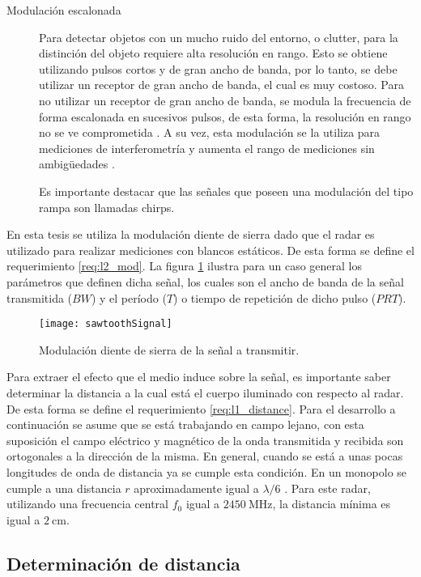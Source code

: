\begin{description}
\item[Modulación escalonada] Para detectar objetos con un mucho ruido del entorno, o clutter, para la distinción del objeto requiere alta resolución en rango. Esto se obtiene utilizando pulsos cortos y de gran ancho de banda, por lo tanto, se debe utilizar un receptor de gran ancho de banda, el cual es muy costoso. Para no utilizar un receptor de gran ancho de banda, se modula la frecuencia de forma escalonada en sucesivos pulsos, de esta forma, la resolución en rango no se ve comprometida \cite{steppedFreq}. A su vez, esta modulación se la utiliza para mediciones de interferometría y aumenta el rango de mediciones sin ambigüedades \cite{Basics2015}.

Es importante destacar que las señales que poseen una modulación del tipo rampa son llamadas chirps.

\end{description}

En esta tesis se utiliza la modulación diente de sierra dado que el radar es utilizado para realizar mediciones con blancos estáticos. De esta forma se define el requerimiento \ref{req:l2_mod}. La figura \ref{fig:sawtoothSignal} ilustra para un caso general los parámetros que definen dicha señal, los cuales son el ancho de banda de la señal transmitida ($BW$) y el período ($T$) o tiempo de repetición de dicho pulso ($PRT$).

\begin{figure}
 \centering
 \texttt{[image: sawtoothSignal]}
 \caption{Modulación diente de sierra de la señal a transmitir.}
 \label{fig:sawtoothSignal}
\end{figure}

Para extraer el efecto que el medio induce sobre la señal, es importante saber determinar la distancia a la cual está el cuerpo iluminado con respecto al radar. De esta forma se define el requerimiento \ref{req:l1_distance}. Para el desarrollo a continuación se asume que se está trabajando en campo lejano, con esta suposición el campo eléctrico y magnético de la onda transmitida y recibida son ortogonales a la dirección de la misma. En general, cuando se está a unas pocas longitudes de onda de distancia ya se cumple esta condición. En un monopolo se cumple a una distancia $r$ aproximadamente igual a $\lambda/ 6$ \cite{Richards2009}. Para este radar, utilizando una frecuencia central $f_0$ igual a $\SI{2450}{\MHz}$, la distancia mínima es igual a $\SI{2}{\centi\meter}$.


\subsection{Determinación de distancia}

